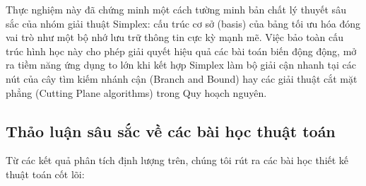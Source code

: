 \documentclass[fontsize=13pt,a4paper]{report}
\begin{document}
Thực nghiệm này đã chứng minh một cách tường minh bản chất lý thuyết sâu sắc của nhóm giải thuật Simplex: cấu trúc cơ sở (basis) của bảng tối ưu hóa đóng vai trò như một bộ nhớ lưu trữ thông tin cực kỳ mạnh mẽ. Việc bảo toàn cấu trúc hình học này cho phép giải quyết hiệu quả các bài toán biến động động, mở ra tiềm năng ứng dụng to lớn khi kết hợp Simplex làm bộ giải cận nhanh tại các nút của cây tìm kiếm nhánh cận (Branch and Bound) hay các giải thuật cắt mặt phẳng (Cutting Plane algorithms) trong Quy hoạch nguyên.

\FloatBarrier
\subsection{Thảo luận sâu sắc về các bài học thuật toán}
\label{subsec:discussion}

Từ các kết quả phân tích định lượng trên, chúng tôi rút ra các bài học thiết kế thuật toán cốt lõi:
\end{document}
